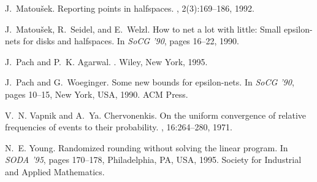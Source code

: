 \documentclass{stacs_proc}
\begin{document}
\begin{thebibliography}{10}
J.~Matou\v{s}ek.
\newblock Reporting points in halfspaces.
, 2(3):169--186, 1992.

J.~Matou\v{s}ek, R.~Seidel, and E.~Welzl.
\newblock How to net a lot with little: Small epsilon-nets for disks and
  halfspaces.
\newblock In {\em SoCG '90}, pages 16--22, 1990.

J.~Pach and P.~K. Agarwal.
.
\newblock Wiley, New York, 1995.

J.~Pach and G.~Woeginger.
\newblock Some new bounds for epsilon-nets.
\newblock In {\em SoCG '90}, pages 10--15, New York, USA, 1990. ACM Press.

V.~N. Vapnik and A.~Ya. Chervonenkis.
\newblock On the uniform convergence of relative frequencies of events to their
  probability.
, 16:264--280, 1971.

N.~E. Young.
\newblock Randomized rounding without solving the linear program.
\newblock In {\em SODA '95}, pages 170--178, Philadelphia, PA, USA, 1995.
  Society for Industrial and Applied Mathematics.

\end{thebibliography}
\end{document}
